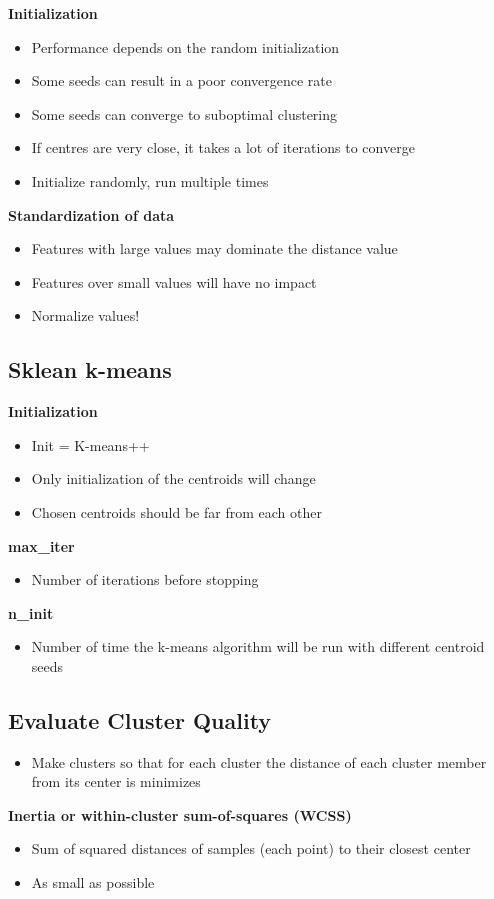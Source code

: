 \textbf{Initialization}
\begin{itemize}
    \item Performance depends on the random initialization
    \item Some seeds can result in a poor convergence rate
    \item Some seeds can converge to suboptimal clustering
    \item If centres are very close, it takes a lot of iterations to converge
    \item Initialize randomly, run multiple times
\end{itemize}

\textbf{Standardization of data}
\begin{itemize}
    \item Features with large values may dominate the distance value
    \item Features over small values will have no impact
    \item Normalize values!
\end{itemize}

\subsection{Sklean k-means}
\textbf{Initialization}
\begin{itemize}
    \item Init = K-means++
    \item Only initialization of the centroids will change
    \item Chosen centroids should be far from each other
\end{itemize}
\textbf{max\_iter}
\begin{itemize}
    \item Number of iterations before stopping
\end{itemize}
\textbf{n\_init}
\begin{itemize}
    \item Number of time the k-means algorithm will be run with different centroid seeds
\end{itemize}

\subsection{Evaluate Cluster Quality}
\begin{itemize}
    \item Make clusters so that for each cluster the distance of each cluster member from its center is minimizes
\end{itemize}
\textbf{Inertia or within-cluster sum-of-squares (WCSS)}
\begin{itemize}
    \item Sum of squared distances of samples (each point) to their closest center
    \item As small as possible
\end{itemize}

